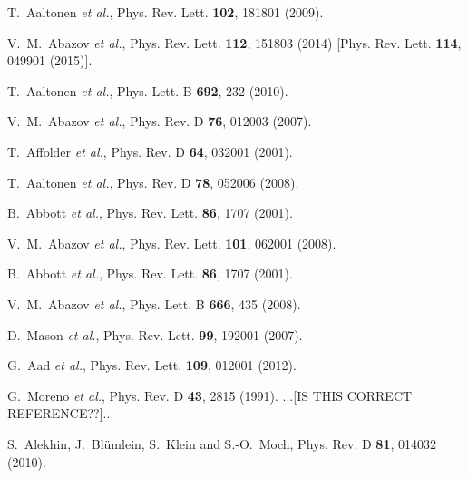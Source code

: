 \documentclass[aps,prd,amsmath,preprint]{revtex4}
\begin{document}
\begin{thebibliography}{99}
T.~Aaltonen {\it et al.},
Phys. Rev. Lett. {\bf 102}, 181801 (2009).

V.~M.~Abazov {\it et al.},
Phys. Rev. Lett. {\bf 112}, 151803 (2014)
[Phys. Rev. Lett. {\bf 114}, 049901 (2015)].

T.~Aaltonen {\it et al.}, 
Phys. Lett. B {\bf 692}, 232 (2010).

V.~M.~Abazov {\it et al.},
Phys. Rev. D {\bf 76}, 012003 (2007).

T.~Affolder {\it et al.},
Phys. Rev. D {\bf 64}, 032001 (2001).

T.~Aaltonen {\it et al.},
Phys. Rev. D {\bf 78}, 052006 (2008).

B.~Abbott {\it et al.},
Phys. Rev. Lett. {\bf 86}, 1707 (2001).

V.~M.~Abazov {\it et al.},
Phys. Rev. Lett. {\bf 101}, 062001 (2008). 

B.~Abbott {\it et al.},
Phys. Rev. Lett. {\bf 86}, 1707 (2001).

V.~M.~Abazov {\it et al.},
Phys. Lett. B {\bf 666}, 435 (2008).

D.~Mason {\it et al.},
Phys. Rev. Lett. {\bf 99}, 192001 (2007).

G.~Aad {\it et al.},
Phys. Rev. Lett. {\bf 109}, 012001 (2012).

%
%
%
%
%

G.~Moreno {\it et al.},  
Phys. Rev. D {\bf 43}, 2815 (1991).
{\color{red}...[IS THIS CORRECT REFERENCE??]...}

S.~Alekhin, J.~Bl\"umlein, S.~Klein and S.-O.~Moch,
Phys. Rev. D {\bf 81}, 014032 (2010).


\end{thebibliography}
\end{document}
